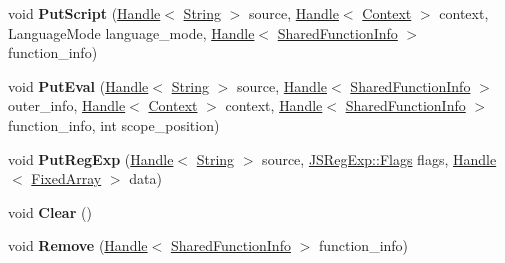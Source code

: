 \begin{DoxyCompactItemize}
\item 
void {\bfseries Put\+Script} (\hyperlink{classv8_1_1internal_1_1_handle}{Handle}$<$ \hyperlink{classv8_1_1internal_1_1_string}{String} $>$ source, \hyperlink{classv8_1_1internal_1_1_handle}{Handle}$<$ \hyperlink{classv8_1_1internal_1_1_context}{Context} $>$ context, Language\+Mode language\+\_\+mode, \hyperlink{classv8_1_1internal_1_1_handle}{Handle}$<$ \hyperlink{classv8_1_1internal_1_1_shared_function_info}{Shared\+Function\+Info} $>$ function\+\_\+info)\hypertarget{classv8_1_1internal_1_1_compilation_cache_a82cbc29a639ebe099d5d93a3ad52fa00}{}\label{classv8_1_1internal_1_1_compilation_cache_a82cbc29a639ebe099d5d93a3ad52fa00}

\item 
void {\bfseries Put\+Eval} (\hyperlink{classv8_1_1internal_1_1_handle}{Handle}$<$ \hyperlink{classv8_1_1internal_1_1_string}{String} $>$ source, \hyperlink{classv8_1_1internal_1_1_handle}{Handle}$<$ \hyperlink{classv8_1_1internal_1_1_shared_function_info}{Shared\+Function\+Info} $>$ outer\+\_\+info, \hyperlink{classv8_1_1internal_1_1_handle}{Handle}$<$ \hyperlink{classv8_1_1internal_1_1_context}{Context} $>$ context, \hyperlink{classv8_1_1internal_1_1_handle}{Handle}$<$ \hyperlink{classv8_1_1internal_1_1_shared_function_info}{Shared\+Function\+Info} $>$ function\+\_\+info, int scope\+\_\+position)\hypertarget{classv8_1_1internal_1_1_compilation_cache_a2e627e0f597efefb3f92c6d4a401021b}{}\label{classv8_1_1internal_1_1_compilation_cache_a2e627e0f597efefb3f92c6d4a401021b}

\item 
void {\bfseries Put\+Reg\+Exp} (\hyperlink{classv8_1_1internal_1_1_handle}{Handle}$<$ \hyperlink{classv8_1_1internal_1_1_string}{String} $>$ source, \hyperlink{classv8_1_1base_1_1_flags}{J\+S\+Reg\+Exp\+::\+Flags} flags, \hyperlink{classv8_1_1internal_1_1_handle}{Handle}$<$ \hyperlink{classv8_1_1internal_1_1_fixed_array}{Fixed\+Array} $>$ data)\hypertarget{classv8_1_1internal_1_1_compilation_cache_a9db56d1ad2334deec904f4e8617805d1}{}\label{classv8_1_1internal_1_1_compilation_cache_a9db56d1ad2334deec904f4e8617805d1}

\item 
void {\bfseries Clear} ()\hypertarget{classv8_1_1internal_1_1_compilation_cache_acef1c5d4de3a72dff9ed45578087bec3}{}\label{classv8_1_1internal_1_1_compilation_cache_acef1c5d4de3a72dff9ed45578087bec3}

\item 
void {\bfseries Remove} (\hyperlink{classv8_1_1internal_1_1_handle}{Handle}$<$ \hyperlink{classv8_1_1internal_1_1_shared_function_info}{Shared\+Function\+Info} $>$ function\+\_\+info)\hypertarget{classv8_1_1internal_1_1_compilation_cache_a870250701c54985a59a2fc6bed4a2323}{}\label{classv8_1_1internal_1_1_compilation_cache_a870250701c54985a59a2fc6bed4a2323}


\end{DoxyCompactItemize}

